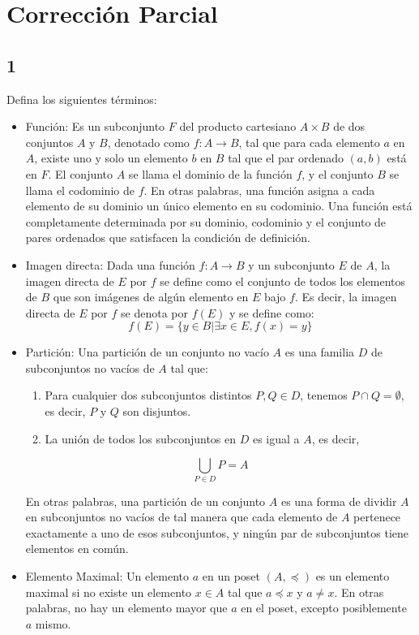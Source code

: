 \documentclass{report}
\begin{document}
    \tableofcontents
    \setlength{\parindent}{0pt}
    \pagebreak
    \chapter{ Corrección Parcial }
        \section*{1}
            Defina los siguientes términos:
            \begin{itemize}
                \item Función: Es un subconjunto $F$ del producto cartesiano $A \times B$ de dos conjuntos $A$ y $B$, denotado como $f: A \rightarrow B$, tal que para cada elemento $a$ en $A$, existe uno y solo un elemento $b$ en $B$ tal que el par ordenado $(a, b)$ está en $F$. El conjunto $A$ se llama el dominio de la función $f$, y el conjunto $B$ se llama el codominio de $f$. En otras palabras, una función asigna a cada elemento de su dominio un único elemento en su codominio. Una función está completamente determinada por su dominio, codominio y el conjunto de pares ordenados que satisfacen la condición de definición.
                \item Imagen directa: Dada una función $f: A \rightarrow B$ y un subconjunto $E$ de $A$, la imagen directa de $E$ por $f$ se define como el conjunto de todos los elementos de $B$ que son imágenes de algún elemento en $E$ bajo $f$. Es decir, la imagen directa de $E$ por $f$ se denota por $f(E)$ y se define como:
                $$f(E) = \{y \in B | \exists x \in E, f(x) = y\}$$
                \item Partición: Una partición de un conjunto no vacío $A$ es una familia $D$ de subconjuntos no vacíos de $A$ tal que:

                \begin{enumerate}
                    \item Para cualquier dos subconjuntos distintos $P,Q \in D$, tenemos $P \cap Q = \emptyset$, es decir, $P$ y $Q$ son disjuntos.
                    \item La unión de todos los subconjuntos en $D$ es igual a $A$, es decir,
                \end{enumerate}

                $$
                \bigcup_{P \in D} P = A
                $$

                En otras palabras, una partición de un conjunto $A$ es una forma de dividir $A$ en subconjuntos no vacíos de tal manera que cada elemento de $A$ pertenece exactamente a uno de esos subconjuntos, y ningún par de subconjuntos tiene elementos en común.
                \item Elemento Maximal: Un elemento $a$ en un poset $(A, \preceq)$ es un elemento maximal si no existe un elemento $x \in A$ tal que $a \preceq x$ y $a \neq x$. En otras palabras, no hay un elemento mayor que $a$ en el poset, excepto posiblemente $a$ mismo.
            \end{itemize}
\end{document}
